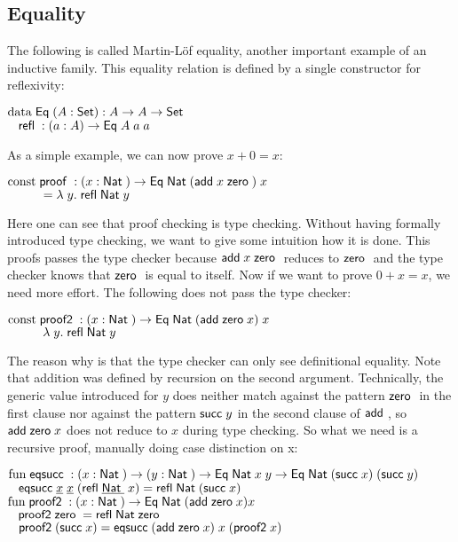 \subsection{Equality}
The following is called Martin-L\"of equality, another important example of an inductive family.
This equality relation is defined by a single constructor for reflexivity:
\begin{bsp}
$\mathrm{data}\; \mathsf{Eq}\; ( A : \mathsf{Set} ) : A \rightarrow A \rightarrow \mathsf{Set} $ \\
$\hspace*{3mm} \mathsf{refl}\; : ( a : A ) \rightarrow{\mathsf{Eq}\;A \; a \; a}$
\end{bsp}
As a simple example, we can now prove $ x + 0 = x $:
\begin{bsp}
$ \mathrm{const}\; \mathsf{proof}\; : ( x : \mathsf{Nat}\; ) \rightarrow{\mathsf{Eq}\;\mathsf{Nat}\;(\mathsf{add}\;x \; \mathsf{zero}\;)\; x} $ \\ 
$ \spcx = \lam{y}\refl \Nat y$ 
\end{bsp}
Here one can see that proof checking is type checking.
Without having formally introduced type checking, we want to give some intuition how it is done.
This proofs passes the type checker because $\mathsf{add}\; x \; \mathsf{zero}\;$ reduces to $\mathsf{zero}\;$ and the type checker knows that $\mathsf{zero}\;$ is equal to itself.
Now if we want to prove $ 0 +  x = x $, we need more effort.
The following does not pass the type checker:
\begin{bsp}
$ \mathrm{const}\; \mathsf{proof2}\; : ( x : \mathsf{Nat}\; ) \rightarrow{\mathsf{Eq}\;\mathsf{Nat}\;(\mathsf{add}\;\mathsf{zero}\;x)\; x} $ \\ 
$ \spcx \lam{y} \refl \Nat y$ 
\end{bsp}
The reason why is that the type checker can only see definitional equality.
Note that addition was defined by recursion on the second argument.
Technically, the generic value introduced for $y$ does neither match against the pattern $\mathsf{zero}\;$ in the first clause
nor against the pattern $\mathsf{succ}\; y$ in the second clause of $\mathsf{add}\;$, so $\mathsf{add}\; \mathsf{zero}\; x$ does not reduce to $x$ during type checking.
So what we need is a recursive proof, manually doing case distinction on x:
\begin{bsp}
$\mathrm{fun}\; \mathsf{eqsucc}\; : ( x : \mathsf{Nat}\; ) \rightarrow( y : \mathsf{Nat}\; ) \rightarrow \mathsf{Eq}\; \mathsf{Nat}\; x \; y \rightarrow \mathsf{Eq}\; \mathsf{Nat}\; (\mathsf{succ}\; x) \; (\mathsf{succ}\; y)$ \\
$\hspace*{3mm} \mathsf{eqsucc}\; \underline{x} \; \underline{x} \; (\mathsf{refl}\; \underline{\mathsf{Nat}\;} \; x) = \mathsf{refl}\; \mathsf{Nat}\; (\mathsf{succ}\; x)$
\vs\\
$\mathrm{fun}\; \mathsf{proof2}\; : ( x : \mathsf{Nat}\; ) \rightarrow \mathsf{Eq}\; \mathsf{Nat}\; (\mathsf{add}\; \mathsf{zero}\; x) x$\\
$\hspace*{3mm} \mathsf{proof2}\; \mathsf{zero}\; = \mathsf{refl}\; \mathsf{Nat}\; \mathsf{zero}\;$\\
$\hspace*{3mm} \mathsf{proof2}\; (\mathsf{succ}\; x) = \mathsf{eqsucc}\; (\mathsf{add}\; \mathsf{zero}\; x)\; x \; (\mathsf{proof2}\; x)$
\end{bsp}

